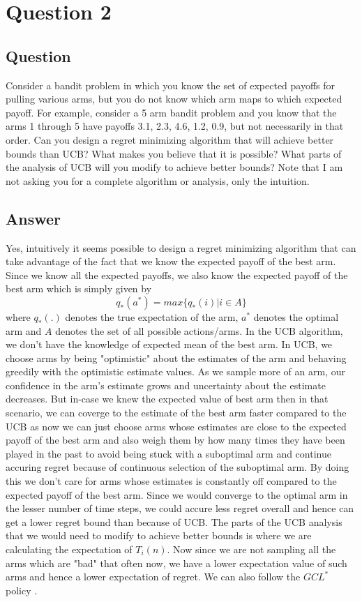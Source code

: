 \documentclass[english]{article}
\begin{document}
\section{Question 2}
\subsection{Question}
Consider a bandit problem in which you know the set of expected payoffs for pulling various arms, but you do not know which arm maps to which expected payoff. For example, consider a 5 arm bandit problem and you know that the arms 1 through 5 have payoffs 3.1, 2.3, 4.6, 1.2, 0.9, but not necessarily in that order. Can you design a regret minimizing algorithm that will achieve better bounds than UCB? What makes you believe that it is possible? What parts of the analysis of UCB will you modify to achieve better bounds? Note that I am not asking you for a complete algorithm or analysis, only the intuition.
\subsection{Answer}
Yes, intuitively it seems possible to design a regret minimizing algorithm that can take advantage of the fact that we know the expected payoff of the best arm. Since we know all the expected payoffs, we also know the expected payoff of the best arm which is simply given by 
$$ q_{*}(a^{*}) = max\{q_{*}(i)| i \in A\} $$ where $q_{*}(.)$ denotes the true expectation of the arm, $a^{*}$ denotes the optimal arm and $A$ denotes the set of all possible actions/arms. 
\newline
\newline
In the UCB algorithm, we don't have the knowledge of expected mean of the best arm. In UCB, we choose arms by being "optimistic" about the estimates of the arm and behaving greedily with the optimistic estimate values. As we sample more of an arm, our confidence in the arm's estimate grows and uncertainty about the estimate decreases. But in-case we knew the expected value of best arm then in that scenario, we can coverge to the estimate of the best arm faster compared to the UCB as now we can just choose arms whose estimates are close to the expected payoff of the best arm and also weigh them by how many times they have been played in the past to avoid being stuck with a suboptimal arm and continue accuring regret because of continuous selection of the suboptimal arm. By doing this we don't care for arms whose estimates is constantly off compared to the expected payoff of the best arm. Since we would converge to the optimal arm in the lesser number of time steps, we could accure less regret overall and hence can get a lower regret bound than because of UCB.
\newline
\newline
The parts of the UCB analysis that we would need to modify to achieve better bounds is where we are calculating the expectation of $T_{i}(n)$. Now since we are not sampling all the arms which are "bad" that often now, we have a lower expectation value of such arms and hence a lower expectation of regret.
\newline
\newline
We can also follow the $GCL^{*}$ policy \cite{paper}.  
\end{document}
